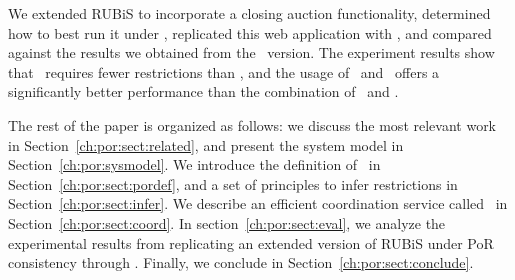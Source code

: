 We extended RUBiS to incorporate a closing auction functionality, determined how to best run it under \PRCN, replicated this web application with \coordtool, and compared against the results
we obtained from the \RBCAJ\ version. The experiment results show that \PRCN\ requires fewer restrictions
than \RBCN, and the usage of \PRCN\ and \coordtool\ offers a significantly better performance than the combination
of \RBCN\ and \Gemini.

The rest of the paper is organized as follows: we discuss the most relevant work in Section~\ref{ch:por:sect:related},
and present the system model in Section~\ref{ch:por:sysmodel}.
We introduce the definition of \PRCN\ in Section~\ref{ch:por:sect:pordef},
and a set of principles to infer restrictions in Section~\ref{ch:por:sect:infer}.
We describe an efficient coordination service called \coordtool\ in Section~\ref{ch:por:sect:coord}.
In section~\ref{ch:por:sect:eval}, we analyze the experimental results from replicating
an extended version of RUBiS under PoR consistency through \coordtool.
Finally, we conclude in Section~\ref{ch:por:sect:conclude}.
